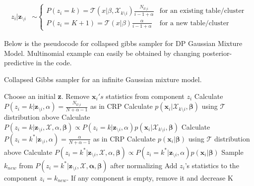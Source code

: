 \documentclass[a4paper]{article}
\begin{document}
\begin{align*}
z_i|\boldsymbol z_{\setminus i}  &\sim \begin{cases}
P(z_i=k)=\mathcal{T}(x|\beta,\mathcal{X}_{k \setminus i})\frac{N_{k\setminus i}}{i-1+\alpha} & \text{for an existing table/cluster} \\
P(z_i=K+1)=\mathcal{T}(x|\beta)\frac{\alpha}{i-1+\alpha} & \text{for a new table/cluster}
\end{cases}
\end{align*}

Below is the pseudocode\cite{kamper2013gibbs} for collapsed gibbs sampler for DP
Gaussian Mixture Model. Multinomial example can easily be obtained by
changing posterior-predictive in the code.


\begin{algorithm}
  \caption{Collapsed Gibbs sampler for an infinite Gaussian mixture model.}\label{collapsedgibbs}
  \begin{algorithmic}[1]
    
  \State Choose an initial \textbf{z}.
   
        \State Remove $\mathbf{x}_i's$ statistics from component $z_i$ 
         
            \State Calculate $P(z_i = k | \mathbf{z}_{\setminus i},\alpha) = \frac{N_{k\setminus i}}{N+\alpha-1}$ as in CRP
            \State Calculate $p(\mathbf{x}_i|\mathcal{X}_{k\setminus i},\mathbf{\beta})$ using $\mathcal{T}$ distribution above
            \State Calculate $P(z_i = k | \mathbf{z}_{\setminus i},\mathcal{X},\alpha,\mathbf{\beta}) \propto P(z_i = k | \mathbf{z}_{\setminus i},\alpha) p(\mathbf{x}_i|\mathcal{X}_{k\setminus i}, \mathbf{\beta})$
        \EndFor
        \State Calculate $P(z_i = k^* | \mathbf{z}_{\setminus i},\alpha) = \frac{\alpha}{N+\alpha-1}$ as in CRP 
        \State Calculate $p(\mathbf{x}_i|\mathbf{\beta})$ using $\mathcal{T}$ distribution above
        \State Calculate $P(z_i = k^* | \mathbf{z}_{\setminus i},\mathcal{X},\alpha, \mathbf{\beta}) \propto P(z_i = k^* | \mathbf{z}_{\setminus i},\alpha)p(\mathbf{x}_i|\mathbf{\beta})$
        \State Sample $k_{new}$ from $P(z_i = k^* | \mathbf{z}_{\setminus i},\mathcal{X},\mathbf{\alpha},\mathbf{\beta})$ after normalizing
        \State Add $z_i$'s statistics to the component $z_i = k_{new}$.
        \State If any component is empty, remove it and decrease K
    \EndFor
  \EndFor
  \end{algorithmic}
\end{algorithm}
\end{document}
